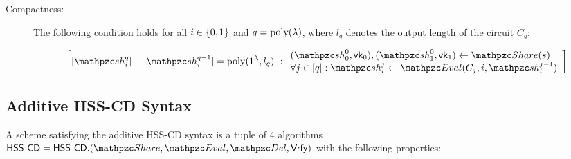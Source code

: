 \begin{description}
\item [Compactness:] The following condition holds for all $i \in
\{0,1\}$ and $q = {\mathrm{poly}}(\lambda)$, where $l_q$ denotes the output length
of the circuit $C_q$:

\begin{align}
\left[
|\qsh_i^q| - |\qsh_i^{q-1}| = \poly(1^\secp, l_q)
\ :
\begin{array}{ll}
(\qsh_0^0, \vk_0), (\qsh_1^0, \vk_1) \gets \Sh(s)\\
\forall j \in [q]: \qsh_i^j \leftarrow \Ev(C_j, i,
\qsh_i^{j-1})\\
\end{array}
\right]
\end{align}
\end{description}

\subsection{Additive HSS-CD Syntax}

A scheme satisfying the additive HSS-CD syntax is a tuple of 4
algorithms $\HSScd = \HSScd.(\Sh, \Ev, \Del, \Vrfy)$ with the
following properties:


